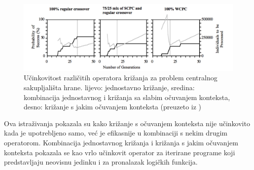 \begin{figure}[H]
	\centering
	\includegraphics[scale=0.4]{./slike/ants.png}
	\caption{Učinkovitost različitih operatora križanja za problem centralnog sakupljališta hrane. lijevo: jednostavno križanje, sredina: kombinacija jednostavnog i križanja sa slabim očuvanjem konteksta, desno:  križanje s jakim očuvanjem konteksta (preuzeto iz \cite{crxContext})}
	\label{ants}
\end{figure}



Ova istraživanja pokazala su kako križanje s očuvanjem konteksta nije učinkovito kada je upotrebljeno samo, već je efikasnije u kombinaciji s nekim drugim operatorom. Kombinacija jednostavnog križanja i križanja s jakim očuvanjem konteksta pokazala se kao vrlo učinkovit operator za iterirane programe koji predstavljaju neovisnu jedinku i za pronalazak logičkih funkcija.

